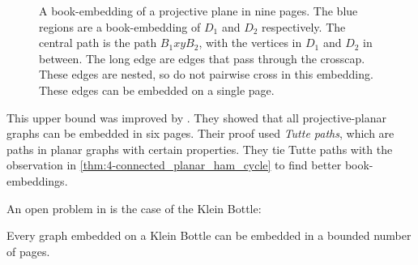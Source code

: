 \begin{figure}[h]
    \centering
    
    \caption[Projective-Planar book-embedding]{A book-embedding of a projective plane in nine pages. The blue regions are a book-embedding of $D_1$ and $D_2$ respectively. The central path is the path $B_1 xy B_2$, with the vertices in $D_1$ and $D_2$ in between. The long edge are edges that pass through the crosscap. These edges are nested, so do not pairwise cross in this embedding. These edges can be embedded on a single page. }\label{fig:projectiveplanarbookembedding}
\end{figure}
 This upper bound was improved by \textcite{ozekiBookEmbeddingGraphs2019}. They showed that all projective-planar graphs can be embedded in six pages. Their proof used \textit{Tutte paths}, which are paths in planar graphs with certain properties. They tie Tutte paths with the observation in \cref{thm:4-connected_planar_ham_cycle} to find better book-embeddings. 

An open problem in \textcite{ozekiBookEmbeddingGraphs2019} is the case of the Klein Bottle:
\begin{conjecture}\label{conj:klein_bottle}
    Every graph embedded on a Klein Bottle can be embedded in a bounded number of pages.
\end{conjecture}
